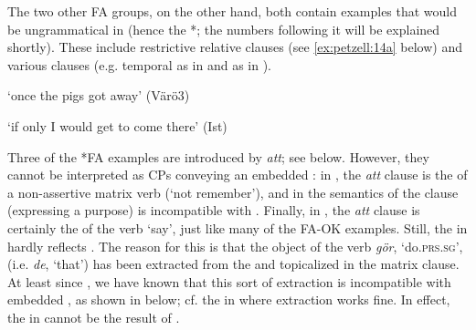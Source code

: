 \documentclass[output=paper,colorlinks,citecolor=brown,draft,draftmode]{langscibook}
\begin{document}
The two other FA groups, on the other hand, both contain examples that would be ungrammatical in  (hence the *; the numbers following it will be explained shortly). These include restrictive relative clauses (see \ref{ex:petzell:14a} below) and various  clauses (e.g. temporal as in  and  as in ).


\ea\label{ex:petzell:14}

\glt `once the pigs got away’ (Värö3)

\glt `if only I would get to come there’ (Ist)
\z
\z


Three of the *FA examples are introduced by \textit{att}; see  below. However, they cannot be interpreted as CPs conveying an embedded : in , the \textit{att} clause is the  of a non-assertive matrix verb (‘not remember’), and in  the semantics of the clause (expressing a purpose) is incompatible with . Finally, in , the \textit{att} clause is certainly the  of the verb ‘say’, just like many of the FA-OK examples. Still, the  in  hardly reflects  . The reason for this is that the object of the verb \textit{gör}, ‘do.\textsc{prs}.\textsc{sg}’, (i.e. \textit{de}, ‘that’) has been extracted from the  and topicalized in the matrix clause. At least since \citet{Holmberg1986}, we have known that this sort of extraction is incompatible with embedded , as shown in  below; cf. the  in  where extraction works fine. In effect, the  in  cannot be the result of .
\end{document}
